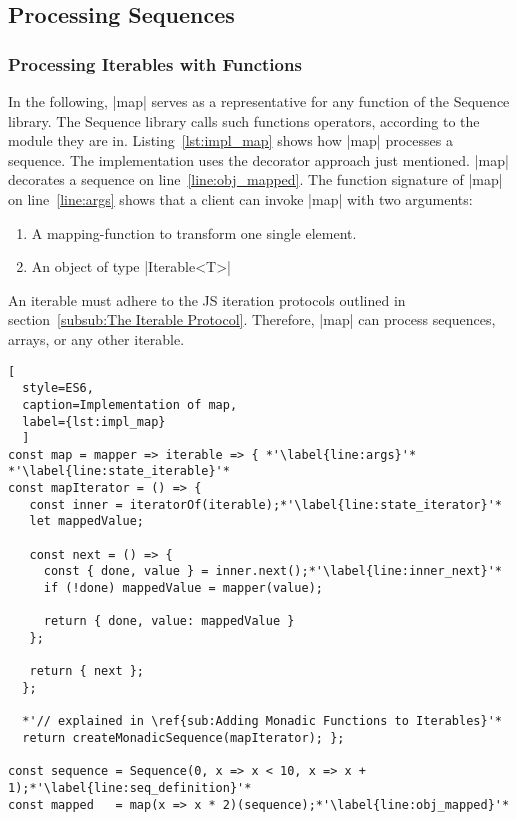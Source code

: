 \subsection{Processing Sequences}
\label{sub:Processing Sequences}

\subsubsection{Processing Iterables with Functions}
\label{subsub:Processing Iterables with Functions}
In the following, |map| serves as a representative for any function of the
Sequence library. The Sequence library calls such functions operators, according
to the module they are in.
Listing~\ref{lst:impl_map} shows how |map| processes a sequence. The
implementation uses the decorator approach just mentioned. |map| decorates a
sequence on line~\ref{line:obj_mapped}.
\newline
The function signature of |map| on line~\ref{line:args} shows that a client
can invoke |map| with two arguments:

\begin{enumerate}
  \item{A mapping-function to transform one single element.}
  \item{An object of type |Iterable<T>|}
\end{enumerate}

An iterable must adhere to the JS iteration protocols outlined in
section~\ref{subsub:The Iterable Protocol}. Therefore, |map| can process
sequences, arrays, or any other iterable. 

\begin{lstlisting}[
  style=ES6, 
  caption=Implementation of map,
  label={lst:impl_map}
  ]
const map = mapper => iterable => { *'\label{line:args}'*
*'\label{line:state_iterable}'*
const mapIterator = () => {
   const inner = iteratorOf(iterable);*'\label{line:state_iterator}'*
   let mappedValue;
 
   const next = () => {
     const { done, value } = inner.next();*'\label{line:inner_next}'*
     if (!done) mappedValue = mapper(value);
 
     return { done, value: mappedValue }
   };
 
   return { next };
  };

  *'// explained in \ref{sub:Adding Monadic Functions to Iterables}'*
  return createMonadicSequence(mapIterator); };

const sequence = Sequence(0, x => x < 10, x => x + 1);*'\label{line:seq_definition}'*
const mapped   = map(x => x * 2)(sequence);*'\label{line:obj_mapped}'*
\end{lstlisting}


